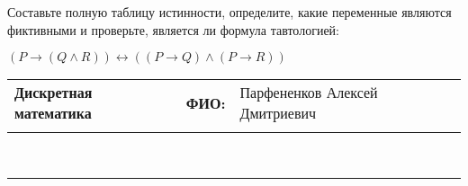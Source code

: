 \documentclass[10pt]{exam}
\newcommand{\class}{Дискретная математика}
\newcommand{\examdate}{}
\begin{document}
\begin{questions}
\begin{enumerate} [a)]
\end{enumerate}\question Составьте полную таблицу истинности, определите, какие переменные являются фиктивными и проверьте, является ли формула тавтологией:

$(P \rightarrow (Q \land R)) \leftrightarrow ((P \rightarrow Q) \land (P \rightarrow R))$

\end{questions}
\newpage
\begin{flushright}
\begin{tabular}{p{2.8in} r l}
\textbf{\class} & \textbf{ФИО:} &Парфененков Алексей Дмитриевич
\\

\textbf{\examdate} &&\\
\end{tabular}\\
\end{flushright}
\rule[1ex]{\textwidth}{.1pt}
\end{document}

